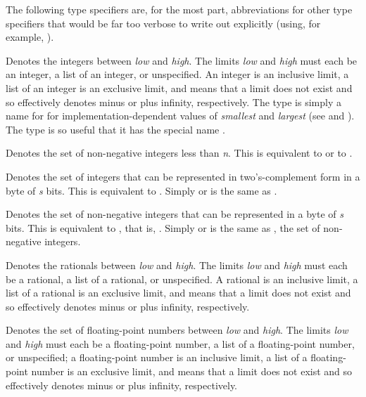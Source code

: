The following type specifiers are, for the most part,
abbreviations for other type specifiers that would be far too
verbose to write out explicitly (using, for example, ).

\begin{flushdesc}
\item[\cd{(integer \emph{low} \emph{high})}]
Denotes the integers between
\emph{low} and \emph{high}.  The limits \emph{low} and \emph{high}
must each be an integer, a list of an integer, or unspecified.
An integer is an inclusive limit,
a list of an integer is an exclusive limit, and
\cdf{*} means that a limit does not exist
and so effectively denotes minus or plus infinity, respectively.
The type  is simply a name
for  for implementation-dependent
values of \emph{smallest} and \emph{largest}
(see  and ).
The type 
is so useful that it has the special name .

\item[\cd{(mod \emph{n})}]
Denotes the set of non-negative integers less than \emph{n}.
This is equivalent to 
or to .

\item[\cd{(signed-byte \emph{s})}]
Denotes the set of integers that can be represented
in two's-complement form in a byte of \emph{s} bits.  This is
equivalent to
.
Simply  or  is the same as .

\item[\cd{(unsigned-byte \emph{s})}]
Denotes the set of non-negative integers that can be
represented in a byte of \emph{s} bits.  This is equivalent to , that is, .
Simply  or  is the same as
, the set of non-negative integers.

\item[\cd{(rational \emph{low} \emph{high})}]
Denotes the rationals between
\emph{low} and \emph{high}.  The limits \emph{low} and \emph{high}
must each be a rational, a list of a rational, or unspecified.
A rational is an inclusive limit,
a list of a rational is an exclusive limit, and
\cdf{*} means that a limit does not exist
and so effectively denotes minus or plus infinity, respectively.

\item[\cd{(float \emph{low} \emph{high})}]
Denotes the set of floating-point numbers between
\emph{low} and \emph{high}.  The limits \emph{low} and \emph{high}
must each be a floating-point number, a list of a floating-point number,
or unspecified; a floating-point number is an inclusive limit, a list of a
floating-point number is an exclusive limit, and
\cdf{*} means that a limit does not exist
and so effectively denotes minus or plus infinity, respectively.


\end{flushdesc}
